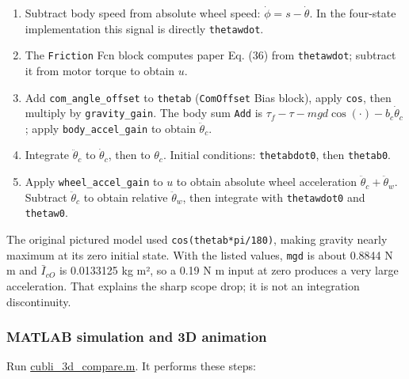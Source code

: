 \documentclass[
]{article}
\providecommand{\tightlist}{%
  \setlength{\itemsep}{0pt}\setlength{\parskip}{0pt}}
\begin{document}
\begin{enumerate}
\def\labelenumi{\arabic{enumi}.}
\tightlist
\item
  Subtract body speed from absolute wheel speed:
  \(\dot\phi=s-\dot\theta\). In the four-state implementation this
  signal is directly \texttt{thetawdot}.
\item
  The \texttt{Friction} Fcn block computes paper Eq. (36) from
  \texttt{thetawdot}; subtract it from motor torque to obtain \(u\).
\item
  Add \texttt{com\_angle\_offset} to \texttt{thetab} (\texttt{ComOffset}
  Bias block), apply \texttt{cos}, then multiply by
  \texttt{gravity\_gain}. The body sum \texttt{Add} is
  \(\tau_f-\tau-mgd\cos(\cdot)-b_c\dot\theta_c\); apply
  \texttt{body\_accel\_gain} to obtain \(\ddot\theta_c\).
\item
  Integrate \(\ddot\theta_c\) to \(\dot\theta_c\), then to \(\theta_c\).
  Initial conditions: \texttt{thetabdot0}, then \texttt{thetab0}.
\item
  Apply \texttt{wheel\_accel\_gain} to \(u\) to obtain absolute wheel
  acceleration \(\ddot\theta_c+\ddot\theta_w\). Subtract
  \(\ddot\theta_c\) to obtain relative \(\ddot\theta_w\), then integrate
  with \texttt{thetawdot0} and \texttt{thetaw0}.
\end{enumerate}

The original pictured model used \texttt{cos(thetab*pi/180)}, making
gravity nearly maximum at its zero initial state. With the listed
values, \texttt{mgd} is about 0.8844 N m and \(\bar I_{cO}\) is
0.0133125 kg m², so a 0.19 N m input at zero produces a very large
acceleration. That explains the sharp scope drop; it is not an
integration discontinuity.

\subsubsection{MATLAB simulation and 3D
animation}\label{matlab-simulation-and-3d-animation}

Run \href{Matlab\%20sim/cubli_3d_compare.m}{cubli\_3d\_compare.m}. It
performs these steps:
\end{document}
